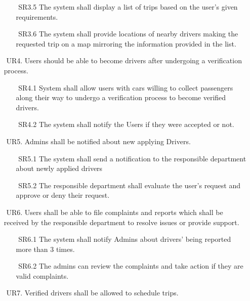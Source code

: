 \documentclass[a4paper, 12pt]{article} %
\begin{document}
\begin{itemize}
\begin{itemize}
                    \item [$ $] SR3.5 The system shall display a list of trips based on the user's given requirements.
                    \item [$ $] SR3.6 The system shall provide locations of nearby drivers making the requested trip on a map mirroring the information provided in the list. 
                \end{itemize}
               \item [$ $] UR4. Users should be able to become drivers after undergoing a verification process. 
               \begin{itemize}
                   \item [$ $] SR4.1 System shall allow users with cars willing to collect passengers along their way to undergo a verification process to become verified drivers.
                    \item [$ $] SR4.2 The system shall notify the Users if they were accepted or not.
               \end{itemize}            
                \item [$ $] UR5. Admins shall be notified about new applying Drivers.
                \begin{itemize}
                    \item [$ $] SR5.1 The system shall send a notification to the responsible department about newly applied drivers
                    \item [$ $] SR5.2 The responsible department shall evaluate the user’s request and approve or deny their request. 
                \end{itemize}
                \item [$ $] UR6. Users shall be able to file complaints and reports which shall be received by the responsible department to resolve issues or provide support.
                \begin{itemize}
                    \item [$ $] SR6.1 The system shall notify Admins about drivers’ being reported more than 3 times.
                    \item [$ $] SR6.2 The admins can review the complaints and take action if they are valid complaints.
                \end{itemize}
                \item [$ $] UR7. Verified drivers shall be allowed to schedule trips.
                \begin{itemize}

\end{itemize}
\end{itemize}
\end{document}
